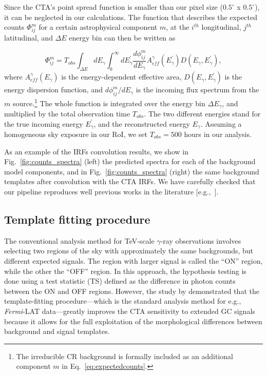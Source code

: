 \documentclass[doublespace,nopageskip]{VTthesis} %
\begin{document}
Since the CTA's point spread function is smaller than our pixel size ($0.5^{\circ} $ x $ 0.5^{\circ}$), it can be neglected in our calculations. The function that describes the expected counts $\Phi^m_{ij}$ for a certain astrophysical component $m$, at the $i^{th}$ longitudinal, $j^{th}$ latitudinal, and $\Delta E$ energy bin can then be written as

\begin{equation}\label{eq:expectedcounts}
    \Phi^m_{ij} = T_{obs} \int_{\Delta E} dE_{\gamma} \int_{0}^{\infty} dE^{'}_{\gamma}  \frac{d\phi^{m}_{ij}}{dE_{\gamma}} A^{\gamma}_{eff}(E^{'}_{\gamma}) D(E_{\gamma},E_{\gamma}^{'}),
\end{equation} 
where $A^{\gamma}_{eff}(E_\gamma)$ is the energy-dependent effective area, $D(E_{\gamma},E_{\gamma}^{'})$ is the energy dispersion function, and $d\phi^{m}_{ij}/dE_{\gamma}$ is the incoming flux spectrum from the $m$ source.\footnote{The irreducible CR background is formally included as an additional component $m$ in Eq.~\ref{eq:expectedcounts}.} The whole function is integrated over the energy bin $\Delta E_{\gamma}$, and multiplied by the total observation time $T_{obs}$. The two different energies stand for the true incoming energy $E_{\gamma}^{'}$, and the reconstructed energy $E_{\gamma}$. Assuming a homogeneous sky exposure in our RoI, we set $T_{obs}=500$ hours in our analysis. 

As an example of the IRFs convolution results, we show in Fig.~\ref{fig:counts_spectra} (left) the predicted spectra for each of the background model components, and in Fig.~\ref{fig:counts_spectra} (right) the same background templates after convolution with the CTA IRFs. We have carefully checked that our pipeline reproduces well previous works in the literature [e.g.,~\citep{Rinchiuso:2020skh}].


\subsection{Template fitting procedure}
\label{sub:templatefitting}

The conventional analysis method for TeV-scale $\gamma$-ray observations involves selecting two regions of the sky with approximately the same backgrounds, 
but different expected signals. The region with larger signal is called the ``ON'' region, while the other the ``OFF'' region. In this approach, the hypothesis testing is done using a test statistic (TS) defined as the difference in photon counts between the ON and OFF regions. However, the study by \cite{Silverwood:2014yza} demonstrated that the template-fitting procedure---which is the standard analysis method for e.g., \textit{Fermi}-LAT data---greatly improves the CTA sensitivity to extended GC signals because it allows for the full exploitation of the morphological differences between background and signal templates. 
\end{document}
